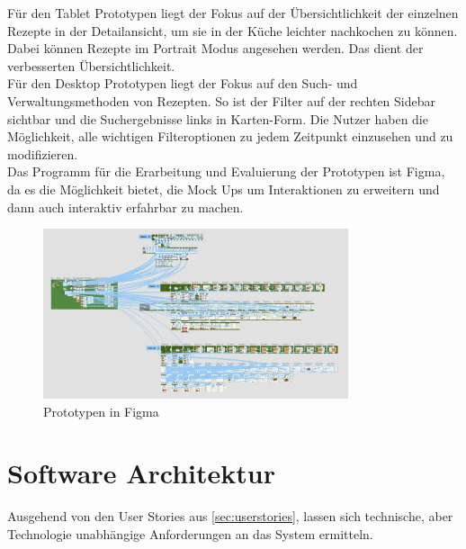 Für den Tablet Prototypen liegt der Fokus auf der Übersichtlichkeit der einzelnen Rezepte in der Detailansicht, um sie in der Küche leichter nachkochen zu können. Dabei können Rezepte im Portrait Modus angesehen werden. Das dient der verbesserten Übersichtlichkeit. \\ 

Für den Desktop Prototypen liegt der Fokus auf den Such- und Verwaltungsmethoden von Rezepten. So ist der Filter auf der rechten Sidebar sichtbar und die Suchergebnisse links in Karten-Form. Die Nutzer haben die Möglichkeit, alle wichtigen Filteroptionen zu jedem Zeitpunkt einzusehen und zu modifizieren. \\

Das Programm für die Erarbeitung und Evaluierung der Prototypen ist Figma, da es die Möglichkeit bietet, die Mock Ups um Interaktionen zu erweitern und dann auch interaktiv erfahrbar zu machen. \\

\begin{figure}[h] %
    \center
    \includegraphics[width=0.8\textwidth]{images/prototyping.png}
    \caption[Prototypen in Figma]{Prototypen in Figma}
    \label{fig:prototyping}
\end{figure}

\section{Software Architektur}
Ausgehend von den User Stories aus \ref{sec:userstories}, lassen sich technische, aber Technologie unabhängige Anforderungen an das System ermitteln. 

